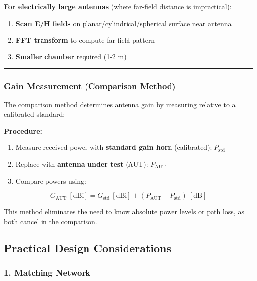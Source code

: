 \textbf{For electrically large antennas} (where far-field distance is
impractical):

\begin{enumerate}
\def\labelenumi{\arabic{enumi}.}
\tightlist
\item
  \textbf{Scan E/H fields} on planar/cylindrical/spherical surface near
  antenna
\item
  \textbf{FFT transform} to compute far-field pattern
\item
  \textbf{Smaller chamber} required (1-2 m)
\end{enumerate}

\begin{center}\rule{0.5\linewidth}{0.5pt}\end{center}

\subsubsection{Gain Measurement (Comparison Method)}

The comparison method determines antenna gain by measuring relative to a calibrated standard:

\textbf{Procedure:}
\begin{enumerate}
\item Measure received power with \textbf{standard gain horn} (calibrated): $P_{\text{std}}$
\item Replace with \textbf{antenna under test} (AUT): $P_{\text{AUT}}$
\item Compare powers using:
\end{enumerate}

\begin{equation}
G_{\text{AUT}}\ [\text{dBi}] = G_{\text{std}}\ [\text{dBi}] + (P_{\text{AUT}} - P_{\text{std}})\ [\text{dB}]
\label{eq:gain-comparison}
\end{equation}

This method eliminates the need to know absolute power levels or path loss, as both cancel in the comparison.

\subsection{Practical Design
Considerations}\label{practical-design-considerations}

\subsubsection{1. Matching Network}\label{matching-network}

